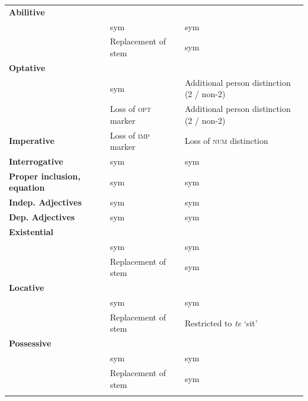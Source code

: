 \documentclass[output=paper,colorlinks,citecolor=brown]{langscibook}
\begin{document}
\begin{table}[p]
\begin{tabularx}{\textwidth}{lQQ}
%
    \textbf{Abilitive} &&\\
     & {sym} & {sym}\\
      & {Replacement of stem} & {sym}\\

    \textbf{Optative} &&\\
      & {sym} & {Additional person distinction (2 / non-2)}\\
      & {Loss of \textsc{opt} marker} & Additional person distinction (2 / non-2) \\

    \textbf{Imperative} & {Loss of \textsc{imp} marker} & {Loss of \textsc{num} distinction}\\

    \textbf{Interrogative} & {sym} & {sym}\\

    \textbf{Proper inclusion, equation} & {sym} & {sym}\\

    \textbf{Indep. Adjectives} & {sym} & {sym}\\

    \textbf{Dep. Adjectives} & {sym} & {sym}\\

    \textbf{Existential} &&\\
      & {sym} & {sym}\\
      & {Replacement of stem} & {sym}\\

    \textbf{Locative} &&\\
     & {sym} & {sym}\\
     & {Replacement of stem} & {Restricted to \textit{te} ‘sit’}\\

    \textbf{Possessive} &&\\
     & {sym} & {sym}\\
     & {Replacement of stem} & {sym}\\
    \lspbottomrule
\end{tabularx}
\end{table}
\end{document}
